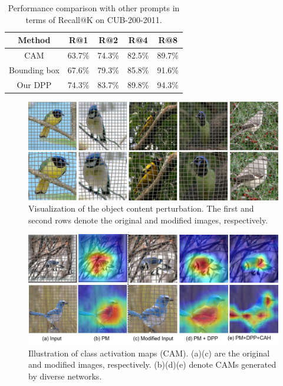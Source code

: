 \documentclass[letterpaper]{article} %
\begin{document}
\begin{table}\centering

\begin{tabular}{c||cccc}
\hline \hline
Method & R@1 & R@2 & R@4 & R@8 \\
\hline
CAM & 63.7\% & 74.3\% & 82.5\%  &89.7\% \\
Bounding box & 67.6\% & 79.3\%& 85.8\%& 91.6\% \\
\hline
Our DPP &74.3\% & 83.7\% & 89.8\% &94.3\% \\
\hline \hline
\end{tabular}
\caption{Performance comparison with other prompts in terms of Recall@K on CUB-200-2011.}
\end{table}




\begin{figure}[!t]
\centering



\includegraphics[width = 0.9\linewidth]{sample.png}
\caption{Visualization of the object content perturbation. The first and second rows denote the original and modified images, respectively.}

\end{figure}
\begin{figure}[!t]
\centering
\includegraphics[width = 0.9\linewidth]{sam.png}
\caption{ Illustration of class activation maps (CAM). (a)(c) are the original and modified images, respectively. (b)(d)(e) denote CAMs generated by diverse networks.}


\end{figure}
\end{document}
